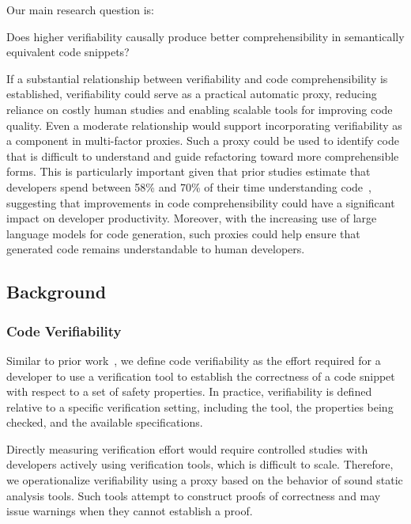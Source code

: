 Our main research question is:

\begin{researchquestions}
\item Does higher verifiability causally produce better comprehensibility in semantically equivalent code snippets?
\end{researchquestions}
  
If a substantial relationship between verifiability and code comprehensibility is established, verifiability could serve as a practical automatic proxy, reducing reliance on costly human studies and enabling scalable tools for improving code quality. Even a moderate relationship would support incorporating verifiability as a component in multi-factor proxies. Such a proxy could be used to identify code that is difficult to understand and guide refactoring toward more comprehensible forms. This is particularly important given that prior studies estimate that developers spend between 58\% and 70\% of their time understanding code~\cite{percent1,scalabrino2017automatically}, suggesting that improvements in code comprehensibility could have a significant impact on developer productivity. Moreover, with the increasing use of large language models for code generation, such proxies could help ensure that generated code remains understandable to human developers.

  
\subsection{Background}
\subsubsection{Code Verifiability}
\label{sec:next-verifiability}

Similar to prior work~\cite{FeldmanKC2023}, we define code verifiability as the effort required for a developer to use a verification tool to establish the correctness of a code snippet with respect to a set of safety properties. In practice, verifiability is defined relative to a specific verification setting, including the tool, the properties being checked, and the available specifications.

Directly measuring verification effort would require controlled studies with developers actively using verification tools, which is difficult to scale. Therefore, we operationalize verifiability using a proxy based on the behavior of sound static analysis tools. Such tools attempt to construct proofs of correctness and may issue warnings when they cannot establish a proof.


